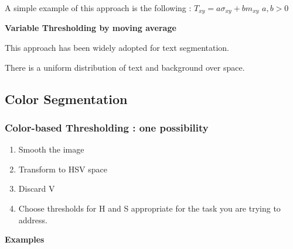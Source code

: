 \documentclass{article}
\begin{document}
A simple example of this approach is the following : $T_{xy} = a \sigma_{xy} + b m_{xy}$    $a,b > 0$

\vspace{1mm}

\textbf{Variable Thresholding by moving average}

\vspace{5mm}

This approach has been widely adopted for text segmentation.

There is a uniform distribution of text and background over space.

\subsection{Color Segmentation}

\subsubsection{Color-based Thresholding : one possibility}

\begin{enumerate}
    \item Smooth the image
    \item Transform to HSV space
    \item Discard V
    \item Choose thresholds for H and S appropriate for the task you are trying to address.
\end{enumerate}

\textbf{Examples}
\end{document}
